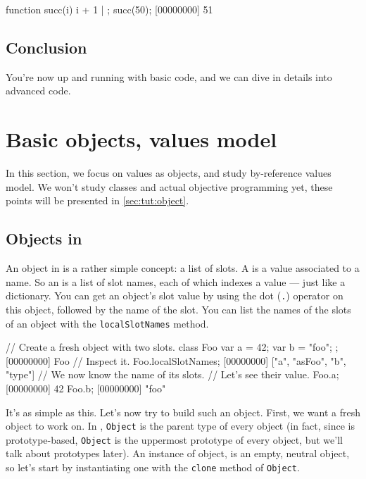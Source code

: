 \begin{urbiscript}
function succ(i) { i + 1 } | {};
succ(50);
[00000000] 51
\end{urbiscript}

\section{Conclusion}

You're now up and running with basic \us code, and we can dive in
details into advanced \us code.

\chapter{Basic objects, \us values model} %
\label{sec:tut:value}

In this section, we focus on \us values as objects, and study \us
by-reference values model. We won't study classes and actual objective
programming yet, these points will be presented in
\autoref{sec:tut:object}.

\section{Objects in \us}
\label{sec:tut:objects}
An object in \us is a rather simple concept: a list of slots. A
 is a value associated to a name. So an  is a
list of slot names, each of which indexes a value --- just like a
dictionary. You can get an object's slot value by using the dot
(\lstinline{.}) operator on this object, followed by the name of the
slot. You can list the names of the slots of an object with the
\lstinline{localSlotNames} method.

\begin{urbiscript}
// Create a fresh object with two slots.
class Foo { var a = 42; var b = "foo"; };
[00000000] Foo
// Inspect it.
Foo.localSlotNames;
[00000000] ["a", "asFoo", "b", "type"]
// We now know the name of its slots.
// Let's see their value.
Foo.a;
[00000000] 42
Foo.b;
[00000000] "foo"
\end{urbiscript}

It's as simple as this. Let's now try to build such an object. First,
we want a fresh object to work on. In \us, \lstinline{Object} is the
parent type of every object (in fact, since \us is prototype-based,
\lstinline{Object} is the uppermost prototype of every object, but
we'll talk about prototypes later). An instance of object, is an
empty, neutral object, so let's start by instantiating one with the
\lstinline{clone} method of \lstinline{Object}.

